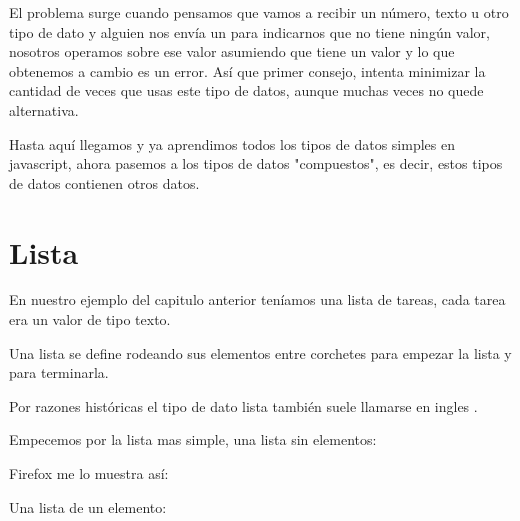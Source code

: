 \documentclass[letterpaper,10pt,spanish]{sphinxmanual}
\begin{document}
%
\begin{sphinxVerbatim}[commandchars=\\\{\}]
 
\end{sphinxVerbatim}

El problema surge cuando pensamos que vamos a recibir un número, texto u otro
tipo de dato y alguien nos envía un  para indicarnos que no tiene ningún
valor, nosotros operamos sobre ese valor asumiendo que tiene un valor y lo que
obtenemos a cambio es un error. Así que primer consejo, intenta minimizar la
cantidad de veces que usas este tipo de datos, aunque muchas veces no quede
alternativa.

Hasta aquí llegamos y ya aprendimos todos los tipos de datos simples en
javascript, ahora pasemos a los tipos de datos "compuestos", es decir, estos
tipos de datos contienen otros datos.


\section{Lista}
\label{\detokenize{datos-con-javascript:lista}}
En nuestro ejemplo del capitulo anterior teníamos una lista de tareas, cada
tarea era un valor de tipo texto.

Una lista se define rodeando sus elementos entre corchetes \sphinxtitleref{{[}} para empezar la
lista y \sphinxtitleref{{]}} para terminarla.

Por razones históricas el tipo de dato lista también suele llamarse en ingles
.

Empecemos por la lista mas simple, una lista sin elementos:

%
\begin{sphinxVerbatim}[commandchars=\\\{\}]
\PYG{p}{[}\PYG{p}{]}
\end{sphinxVerbatim}

Firefox me lo muestra así:

%
\begin{sphinxVerbatim}[commandchars=\\\{\}]
  \PYG{p}{[}\PYG{p}{]}
\end{sphinxVerbatim}

Una lista de un elemento:

%
\begin{sphinxVerbatim}[commandchars=\\\{\}]
\PYG{p}{[}\PYG{p}{]}
\end{sphinxVerbatim}
\end{document}
